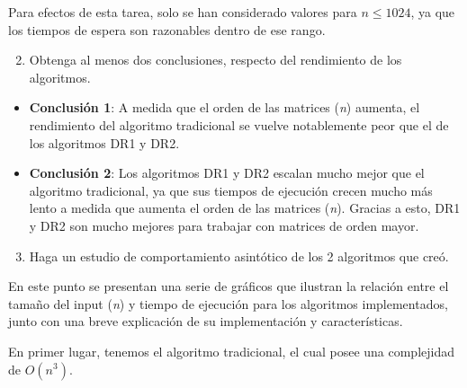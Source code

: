 \documentclass[12pt]{report}
\begin{document}
  Para efectos de esta tarea, solo se han considerado valores para $ n \leq 1024 $, ya que los tiempos de espera son razonables dentro de ese rango.
  
  \begin{enumerate}
    \setcounter{enumi}{1}
    \item Obtenga al menos dos conclusiones, respecto del rendimiento de los algoritmos.
  \end{enumerate}
  
  \begin{itemize}
    \item \textbf{Conclusión 1}: A medida que el orden de las matrices (\textit{n}) aumenta, el rendimiento del algoritmo tradicional se vuelve notablemente peor que el de los algoritmos DR1 y DR2.
    \item \textbf{Conclusión 2}: Los algoritmos DR1 y DR2 escalan mucho mejor que el algoritmo tradicional, ya que sus tiempos de ejecución crecen mucho más lento a medida que aumenta el orden de las matrices (\textit{n}). Gracias a esto, DR1 y DR2 son mucho mejores para trabajar con matrices de orden mayor.
  \end{itemize}
  
  \newpage
  
  \begin{enumerate}
    \setcounter{enumi}{2}
    \item Haga un estudio de comportamiento asintótico de los 2 algoritmos que creó.
  \end{enumerate}
  
  En este punto se presentan una serie de gráficos que ilustran la relación entre el tamaño del input (\textit{n}) y tiempo de ejecución para los algoritmos implementados, junto con una breve explicación de su implementación y características.
  
  En primer lugar, tenemos el algoritmo tradicional, el cual posee una complejidad de $O(n^3)$.

  \begin{center}
  \end{center}
    
\end{document}
